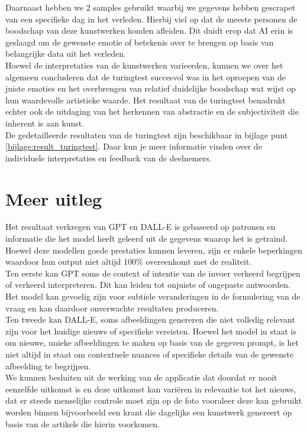 Daarnaast hebben we 2 samples gebruikt waarbij we gegevens hebben gescrapet van een specifieke dag in het verleden. Hierbij viel op dat de meeste personen de boodschap van deze kunstwerken konden afleiden. Dit duidt erop dat AI erin is geslaagd om de gewenste emotie of betekenis over te brengen op basis van belangrijke data uit het verleden.  \\

Hoewel de interpretaties van de kunstwerken varieerden, kunnen we over het algemeen concluderen dat de turingtest succesvol was in het oproepen van de juiste emoties en het overbrengen van relatief duidelijke boodschap wat wijst op hun waardevolle artistieke waarde. Het resultaat van de turingtest benadrukt echter ook de uitdaging van het herkennen van abstractie en de subjectiviteit die inherent is aan kunst. \\

De gedetailleerde resultaten van de turingtest zijn beschikbaar in bijlage punt \ref{bijlage:result_turingtest}. Daar kun je meer informatie vinden over de individuele interpretaties en feedback van de deelnemers.

 
\section{Meer uitleg}
Het resultaat verkregen van GPT en DALL-E is gebaseerd op patronen en informatie die het model heeft geleerd uit de gegevens waarop het is getraind. Hoewel deze modellen goede prestaties kunnen leveren, zijn er enkele beperkingen waardoor hun output niet altijd 100\% overeenkomt met de realiteit. \\

Ten eerste kan GPT soms de context of intentie van de invoer verkeerd begrijpen of verkeerd interpreteren. Dit kan leiden tot onjuiste of ongepaste antwoorden. Het model kan gevoelig zijn voor subtiele veranderingen in de formulering van de vraag en kan daardoor onverwachte resultaten produceren. \\

Ten tweede kan DALL-E, soms afbeeldingen genereren die niet volledig relevant zijn voor het huidige nieuws of specifieke vereisten. Hoewel het model in staat is om nieuwe, unieke afbeeldingen te maken op basis van de gegeven prompt, is het niet altijd in staat om contextuele nuances of specifieke details van de gewenste afbeelding te begrijpen. \\

We kunnen besluiten uit de werking van de applicatie dat doordat er nooit eenzelfde uitkomst is en deze uitkomst kan variëren in relevantie tot het nieuws, dat er steeds menselijke controle moet zijn op de foto vooraleer deze kan gebruikt worden binnen bijvoorbeeld een krant die dagelijks een kunstwerk genereert op basis van de artikels die hierin voorkomen. 
